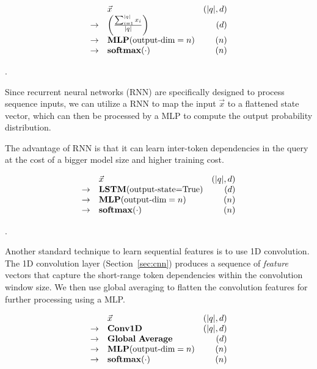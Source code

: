 \documentclass[conference]{IEEEtran}
\begin{document}
$$
\begin{array}{rlr}
&\vec x  & (|q|, d) \\
\to & \left(\frac{\sum_{i=1}^{|q|} x_i}{|q|}\right) & (d) \\
\to & \mathbf{MLP}(\makebox{output-dim}=n) & (n) \\
\to & \mathbf{softmax}(\cdot) & (n) \\
\end{array}
$$

.

Since recurrent neural networks (RNN) are specifically designed to process sequence inputs, we can utilize
a RNN to map the input $\vec x$ to a flattened state vector, which can then be processed
by a MLP to compute the output probability distribution.

The advantage of RNN is that it can learn inter-token dependencies in the query at the cost of
a bigger model size and higher training cost.

$$
\begin{array}{rlr}
&\vec x  & (|q|, d) \\
\to & \mathbf{LSTM}(\makebox{output-state=True}) & (d) \\
\to & \mathbf{MLP}(\makebox{output-dim}=n) & (n) \\
\to & \mathbf{softmax}(\cdot) & (n) \\
\end{array}
$$

.

Another standard technique to learn sequential features is to use 1D convolution.
The 1D convolution layer (Section~\ref{sec:cnn}) produces a sequence of {\em feature} vectors
that capture the short-range token dependencies within the convolution window size.  We then use
global averaging to flatten the convolution features for further processing using a MLP.

$$
\begin{array}{rlr}
&\vec x  & (|q|, d) \\
\to & \mathbf{Conv1D} & (|q|, d) \\
\to & \mathbf{Global\ Average} & (d)\\
\to & \mathbf{MLP}(\makebox{output-dim}=n) & (n) \\
\to & \mathbf{softmax}(\cdot) & (n) \\
\end{array}
$$

\end{document}
